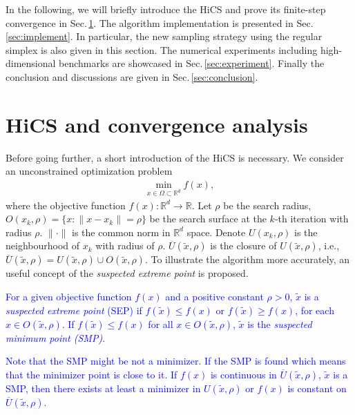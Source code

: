 \documentclass[mathpazo]{csam}
\newcommand{\bbR}{\mathbb{R}}
\theoremstyle{remark}
\begin{document}
In the following, we will briefly introduce the HiCS and
prove its finite-step convergence in Sec.\,\ref{sec:algorithm}. 
The algorithm implementation is presented in Sec.\,\ref{sec:implement}.
In particular, the new sampling strategy using the regular simplex is
also given in this section.
The numerical experiments including high-dimensional benchmarks
are showcased in Sec.\,\ref{sec:experiment}. 
Finally the conclusion and discussions are given in Sec.\,\ref{sec:conclusion}.

\section{HiCS and convergence analysis}
\label{sec:algorithm}

Before going further, a short introduction of the HiCS is necessary.
We consider an unconstrained optimization problem 
\begin{align}
	\min_{x\in\Omega\subset\mathbb{R}^d} f(x),
	\label{}
\end{align}
where the objective function $f(x):\bbR^d\rightarrow \bbR$.
Let $\rho$ be the search radius, $O(x_k, \rho)=\{x:
\|x-x_k \|=\rho\}$ be the search surface at the
$k$-th iteration with radius $\rho$. $\|\cdot \|$ is the common
norm in $\bbR^d$ space. Denote $U(x_k, \rho)$ is the neighbourhood of
$x_k$ with radius of $\rho$.  
$\overline{U}(\tilde{x}, \rho)$ is the closure of $U(\tilde{x}, \rho)$, i.e., 
$\overline{U}(\tilde{x}, \rho) = U(\tilde{x}, \rho)\cup O(\tilde{x}, \rho) $.
To illustrate the algorithm more accurately, an useful concept of the
\textit{suspected extreme point} is proposed.

\textcolor{blue}{
\begin{definition}	
	For a given objective function $f(x)$ and a positive constant 
	$\rho>0$, $\tilde{x}$ is a \textit{suspected extreme point} (SEP) if
	$f(\tilde x)\leq f(x)$ or $f(\tilde x)\geq f(x)$, for each $x \in O(\tilde{x},\rho)$.
	If $f(\tilde x) \leq f(x)$ for all $x\in O(\tilde{x},\rho)$,
	$\tilde{x}$ is the \textit{suspected minimum point (SMP)}.
\end{definition}
\begin{remark}
	Note that the SMP might be not a minimizer. If the SMP is found which means
	that the minimizer point is close to it.
	If $f(x)$ is continuous in $\overline{U}(\tilde{x}, \rho)$,
	$\tilde x$ is a SMP, then there exists at least a minimizer in $U(\tilde x,
	\rho)$ or $f(x)$ is constant on $\overline{U}(\tilde x, \rho)$.
\end{remark}
}
\end{document}
